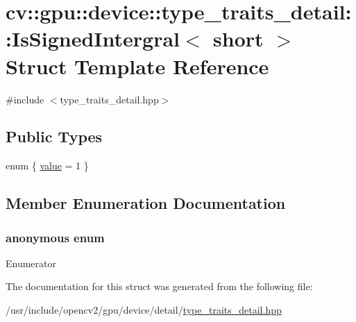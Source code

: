 \hypertarget{structcv_1_1gpu_1_1device_1_1type__traits__detail_1_1IsSignedIntergral_3_01short_01_4}{\section{cv\-:\-:gpu\-:\-:device\-:\-:type\-\_\-traits\-\_\-detail\-:\-:Is\-Signed\-Intergral$<$ short $>$ Struct Template Reference}
\label{structcv_1_1gpu_1_1device_1_1type__traits__detail_1_1IsSignedIntergral_3_01short_01_4}
}


{\ttfamily \#include $<$type\-\_\-traits\-\_\-detail.\-hpp$>$}

\subsection*{Public Types}
\begin{DoxyCompactItemize}
\item 
enum \{ \hyperlink{structcv_1_1gpu_1_1device_1_1type__traits__detail_1_1IsSignedIntergral_3_01short_01_4_adf139077367334436790ea0aca3c3c96abc61f082e3366379b56c88c2292042e4}{value} = 1
 \}
\end{DoxyCompactItemize}


\subsection{Member Enumeration Documentation}
\hypertarget{structcv_1_1gpu_1_1device_1_1type__traits__detail_1_1IsSignedIntergral_3_01short_01_4_adf139077367334436790ea0aca3c3c96}{\subsubsection[{anonymous enum}]{\setlength{\rightskip}{0pt plus 5cm}anonymous enum}}\label{structcv_1_1gpu_1_1device_1_1type__traits__detail_1_1IsSignedIntergral_3_01short_01_4_adf139077367334436790ea0aca3c3c96}
\begin{Desc}
\item[Enumerator]\par
\begin{description}
\item[{\em 
\hypertarget{structcv_1_1gpu_1_1device_1_1type__traits__detail_1_1IsSignedIntergral_3_01short_01_4_adf139077367334436790ea0aca3c3c96abc61f082e3366379b56c88c2292042e4}{value}\label{structcv_1_1gpu_1_1device_1_1type__traits__detail_1_1IsSignedIntergral_3_01short_01_4_adf139077367334436790ea0aca3c3c96abc61f082e3366379b56c88c2292042e4}
}]\end{description}
\end{Desc}


The documentation for this struct was generated from the following file\-:\begin{DoxyCompactItemize}
\item 
/usr/include/opencv2/gpu/device/detail/\hyperlink{type__traits__detail_8hpp}{type\-\_\-traits\-\_\-detail.\-hpp}\end{DoxyCompactItemize}
